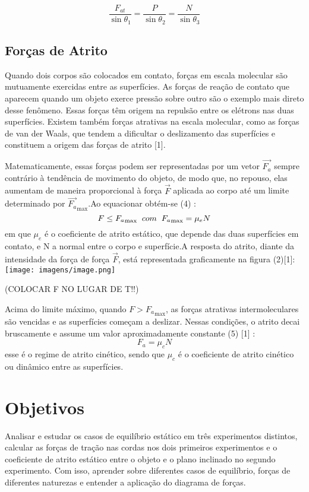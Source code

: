 \documentclass[12pt, letterpaper]{article}
\begin{document}
\begin{equation}
    \frac{F_{at}}{\sin{\theta_{1}}} = \frac{P}{\sin{\theta_{2}}} = \frac{N}{\sin{\theta_{3}}}
\end{equation}
    


\subsection{Forças de Atrito}
Quando dois corpos são colocados em contato, forças em escala
molecular são mutuamente exercidas entre as superfícies. As forças de reação
de contato que aparecem quando um objeto exerce pressão sobre outro são o
exemplo mais direto desse fenômeno. Essas forças têm origem na repulsão
entre os elétrons nas duas superfícies. Existem também forças atrativas na
escala molecular, como as forças de van der Waals, que tendem a dificultar o
deslizamento das superfícies e constituem a origem das forças de atrito [1].


Matematicamente, essas forças podem ser representadas por um vetor $\vec{F_a}$ sempre contrário à tendência de movimento do objeto, de modo que, no repouso, elas aumentam de maneira proporcional à força $\vec{F}$ aplicada ao corpo até um limite determinado por $\vec{F_a}_{\text{max}}$.Ao equacionar obtém-se (4) :
\begin{equation}
F \leq {F_a}_{\text{max}} \hspace{0.2cm} com  \hspace{0.2cm} {F_a}_{\text{max}} = \mu_eN
\end{equation}
em que $\mu_e$ é o coeficiente de atrito estático, que depende das duas superfícies
em contato, e N a normal entre o corpo e superfície.A resposta do atrito, diante da intensidade da força de força $\vec{F}$,
está representada graficamente na figura (2)[1]:
\texttt{[image: imagens/image.png]}

(COLOCAR F NO LUGAR DE T!!)

Acima do limite máximo, quando $F > {F_a}_{\text{max}}$, as forças atrativas
intermoleculares são vencidas e as superfícies começam a deslizar. Nessas
condições, o atrito decai bruscamente e assume um valor aproximadamente
constante (5) [1] :
\begin{equation}
 F_a = \mu_cN   
\end{equation}
esse é o regime de atrito cinético, sendo que $\mu_c$ é o
coeficiente de atrito cinético ou dinâmico entre as superfícies. 

\section{Objetivos}
Analisar e estudar os casos de equilíbrio estático em três experimentos distintos, calcular as forças de tração nas cordas nos dois primeiros experimentos e o coeficiente de atrito estático entre o objeto e o plano inclinado no segundo experimento. Com isso, aprender sobre diferentes casos de equilíbrio, forças de diferentes naturezas e entender a aplicação do diagrama de forças.
\end{document}
